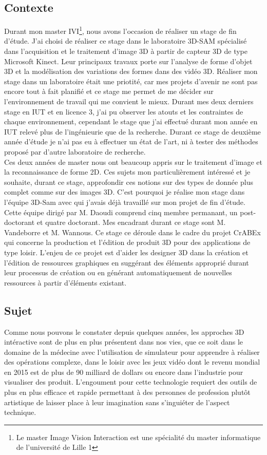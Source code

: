\subsection{Contexte}
Durant mon master IVI\footnote{Le master Image Vision Interaction est 
une spécialité du master informatique de l'université de Lille 1}, 
nous avons l'occasion de réaliser un stage de fin d'étude. J'ai choisi de réaliser ce stage
dans le laboratoire 3D-SAM spécialisé dans l'acquisition et le traitement d'image 3D 
à partir de capteur 3D de type Microsoft Kinect. Leur principaux travaux porte sur
l'analyse de forme d'objet 3D et la modélisation des variations des formes dans des
vidéo 3D. Réaliser mon stage dans un laboratoire était une priotité, car mes projets d'avenir
ne sont pas encore tout à fait planifié et ce stage me permet de me décider sur l'environnement
de travail qui me convient le mieux. Durant mes deux derniers stage en IUT et en licence 3, j'ai pu
observer les atouts et les contraintes de chaque environnement, cependant le stage que j'ai effectué 
durant mon année en IUT relevé plus de l'ingénieurie que de la recherche. Durant ce stage de deuxième
année d'étude je n'ai pas eu à effectuer un état de l'art, ni à tester des méthodes proposé par 
d'autre laboratoire de recherche.\\

Ces deux années de master nous ont beaucoup appris sur le traitement d'image et la reconnaissance de 
forme 2D. Ces sujets mon particulièrement intéressé et je souhaite, durant ce stage, approfondir ces
notions sur des types de donnée plus complet comme sur des images 3D. C'est pourquoi je réalise mon
stage dans l'équipe 3D-Sam avec qui j'avais déjà travaillé sur mon projet de fin d'étude. Cette équipe
dirigé par M. Daoudi comprend cinq membre permanant, un post-doctorant et quatre doctorant. Mes 
encadrant durant ce stage sont M. Vandeborre et M. Wannous. Ce stage ce déroule dans le cadre du
projet CrABEx qui concerne la production et l'édition de produit 3D pour des applications de type
loisir. L'enjeu de ce projet est d'aider les designer 3D dans la création et l'édition de ressources
graphiques en suggérant des éléments approprié durant leur processus de création ou en générant automatiquement 
de nouvelles ressources à partir d'éléments existant.

\subsection{Sujet}
Comme nous pouvons le constater depuis quelques années, les approches 3D intéractive sont de plus en plus 
présentent dans nos vies, que ce soit dans le domaine de la médecine avec l'utilisation de simulateur
pour apprendre à réaliser des opérations complexe, dans le loisir avec les jeux vidéo dont le revenu
mondial en 2015 est de plus de 90 milliard de dollars ou encore dans l'industrie pour visualiser des produit.
L'engoument pour cette technologie requiert des outils de plus en plus efficace et rapide permettant à
des personnes de profession plutôt artistique de laisser place à leur imagination sans s'inguiéter de 
l'aspect technique.\\

